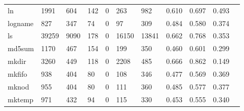 \begin{longtable}{lp{1.10cm}p{1.10cm}p{1.10cm}p{1.10cm}p{1.10cm}p{1.10cm}p{1.10cm}p{1.10cm}p{1.10cm}p{1.10cm}}
ln        &                   1991 &                                604 &                               142 &                                0 &                               263 &                             982 &                             0.610 &                                 0.697 &                               0.493 \\
logname   &                    827 &                                347 &                                74 &                                0 &                                97 &                             309 &                             0.484 &                                 0.580 &                               0.374 \\
ls        &                  39259 &                               9090 &                               178 &                                0 &                             16150 &                           13841 &                             0.662 &                                 0.768 &                               0.353 \\
md5sum    &                   1170 &                                467 &                               154 &                                0 &                               199 &                             350 &                             0.460 &                                 0.601 &                               0.299 \\
mkdir     &                   3260 &                                449 &                               118 &                                0 &                              2208 &                             485 &                             0.666 &                                 0.862 &                               0.149 \\
mkfifo    &                    938 &                                404 &                                80 &                                0 &                               108 &                             346 &                             0.477 &                                 0.569 &                               0.369 \\
mknod     &                    955 &                                404 &                                80 &                                0 &                               111 &                             360 &                             0.485 &                                 0.577 &                               0.377 \\
mktemp    &                    971 &                                432 &                                94 &                                0 &                               115 &                             330 &                             0.453 &                                 0.555 &                               0.340 \\

\end{longtable}
